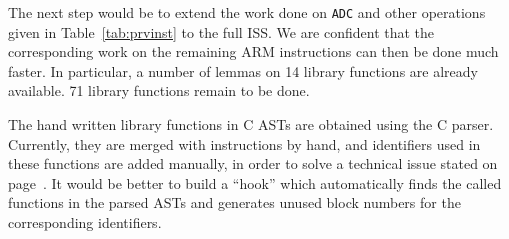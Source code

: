 
The next step would be to
extend the work done on \texttt{ADC} and other operations
given in Table~\ref{tab:prvinst} to the full ISS.
We are confident that the corresponding work on
the remaining ARM instructions can then be done much faster.
In particular, a number of lemmas on 14 library functions
are already available.
71 library functions remain to be done.

The hand written library functions in \compcert C ASTs are obtained
using the \compcert C parser.
Currently, they are merged with instructions by hand,
and identifiers used in these functions are added manually,
in order to solve a technical issue
stated on page~\pageref{page:libfunast}.
It would be better to build a ``hook'' which automatically finds
the called functions in the parsed ASTs and
generates unused block numbers for the corresponding identifiers.

